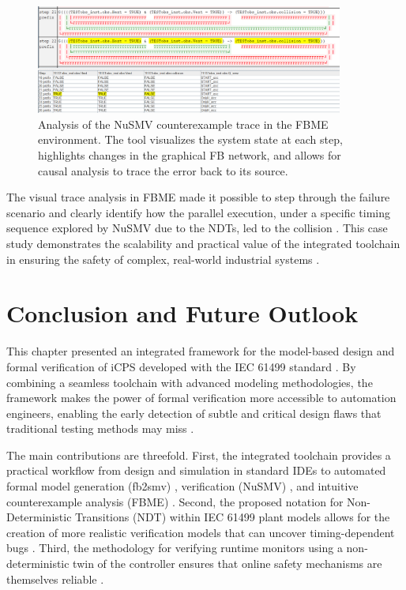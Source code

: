 \begin{figure}[h]
\centering
\includegraphics[width=0.9\textwidth]{chapters/images/chapter2/vizu_jumeauV1.png}
\caption{Analysis of the NuSMV counterexample trace in the FBME environment. The tool visualizes the system state at each step, highlights changes in the graphical FB network, and allows for causal analysis to trace the error back to its source.}
\label{fig:counterexample_analysis}
\end{figure}

The visual trace analysis in FBME made it possible to step through the failure scenario and clearly identify how the parallel execution, under a specific timing sequence explored by NuSMV due to the NDTs, led to the collision \cite{Ovsiannikova2021}. This case study demonstrates the scalability and practical value of the integrated toolchain in ensuring the safety of complex, real-world industrial systems \cite{xavier2023formal}.

\section{Conclusion and Future Outlook}\label{sec:conclusion}

This chapter presented an integrated framework for the model-based design and formal verification of iCPS developed with the IEC 61499 standard \cite{xavier2021cyber}. By combining a seamless toolchain with advanced modeling methodologies, the framework makes the power of formal verification more accessible to automation engineers, enabling the early detection of subtle and critical design flaws that traditional testing methods may miss \cite{patil2015formal}.

The main contributions are threefold. First, the integrated toolchain provides a practical workflow from design and simulation in standard IDEs to automated formal model generation (fb2smv) \cite{fb2smv}, verification (NuSMV) \cite{Cimatti2002}, and intuitive counterexample analysis (FBME) \cite{liakh2022formal}. Second, the proposed notation for Non-Deterministic Transitions (NDT) within IEC 61499 plant models allows for the creation of more realistic verification models that can uncover timing-dependent bugs \cite{xavier2021cyber}. Third, the methodology for verifying runtime monitors using a non-deterministic twin of the controller ensures that online safety mechanisms are themselves reliable \cite{17jhunjhunwala2022monitoring}.

